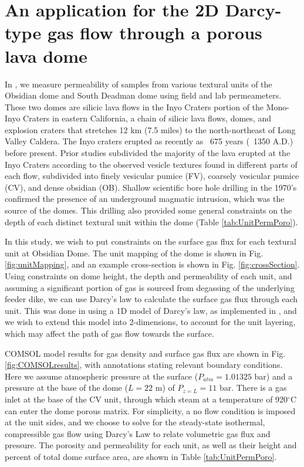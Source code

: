 \documentclass[11pt]{amsart}
\begin{document}
\section{An application for the 2D Darcy-type gas flow through a porous lava dome}

In \cite{Graham2023}, we measure permeability of samples from various textural units of the Obsidian dome and South Deadman dome using field and lab permeameters. These two domes are silicic lava flows in the Inyo Craters portion of the Mono-Inyo Craters in eastern California, a chain of silicic lava flows, domes, and explosion craters that stretches 12 km (7.5 miles) to the north-northeast of Long Valley Caldera. The Inyo craters erupted as recently as ~675 years (~1350 A.D.) before present. Prior studies subdivided the majority of the lava erupted at the Inyo Craters according to the observed vesicle textures found in different parts of each flow, subdivided into finely vesicular pumice (FV), coarsely vesicular pumice (CV), and dense obsidian (OB). Shallow scientific bore hole drilling in the 1970's confirmed the presence of an underground magmatic intrusion, which was the source of the domes. This drilling also provided some general constraints on the depth of each distinct textural unit within the dome (Table \ref{tab:UnitPermPoro}).

In this study, we wish to put constraints on the surface gas flux for each textural unit at Obsidian Dome. The unit mapping of the dome is shown in Fig. \ref{fig:unitMapping}, and an example cross-section is shown in Fig. \ref{fig:crossSection}. Using constraints on dome height, the depth and permeability of each unit, and assuming a significant portion of gas is sourced from degassing of the underlying feeder dike, we can use Darcy's law to calculate the surface gas flux through each unit. This was done in \cite{Graham2023} using a 1D model of Darcy's law, as implemented in \cite{Edmonds2003}, and we wish to extend this model into 2-dimensions, to account for the unit layering, which may affect the path of gas flow towards the surface.

COMSOL model results for gas density and surface gas flux are shown in Fig. \ref{fig:COMSOLresults}, with annotations stating relevant boundary conditions. Here we assume atmospheric pressure at the surface ($P_{atm} = 1.01325$ bar) and a pressure at the base of the dome ($L=22$ m) of $P_{z=L} = 11$ bar. There is a gas inlet at the base of the CV unit, through which steam at a temperature of 920$^{\circ}$C can enter the dome porous matrix. For simplicity, a no flow condition is imposed at the unit sides, and we choose to solve for the steady-state isothermal, compressible gas flow using Darcy's Law to relate volumetric gas flux and pressure. The porosity and permeability for each unit, as well as their height and percent of total dome surface area, are shown in Table \ref{tab:UnitPermPoro}.
\end{document}
